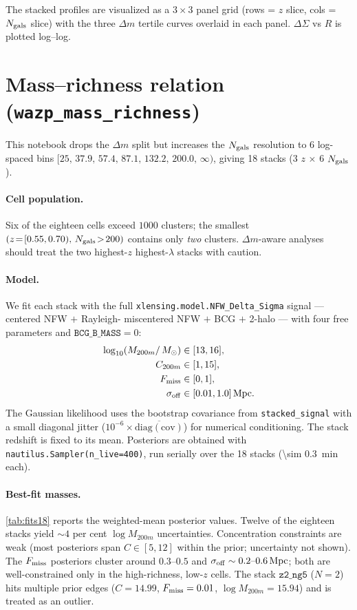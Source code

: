 \documentclass[11pt,a4paper]{article}
\newcommand{\DS}{\Delta\Sigma}
\newcommand{\dm}{\Delta m}
\newcommand{\Msun}{\,M_{\odot}}
\newcommand{\Mpc}{\,\mathrm{Mpc}}
\newcommand{\Mtwoh}{M_{200m}}
\begin{document}
The stacked profiles are visualized as a $3\times3$ panel grid (rows = $z$
slice, cols = $N_{\rm gals}$ slice) with the three $\dm$ tertile curves
overlaid in each panel. ${\DS}$ vs $R$ is plotted log--log.

\section{Mass--richness relation (\texttt{wazp\_mass\_richness})}
\label{sec:massrichness}

This notebook drops the $\dm$ split but increases the $N_{\rm gals}$
resolution to 6 log-spaced bins
$[25,\,37.9,\,57.4,\,87.1,\,132.2,\,200.0,\,\infty)$, giving 18 stacks
($3$ $z$ $\times$ $6$ $N_{\rm gals}$).

\paragraph{Cell population.} Six of the eighteen cells exceed $1000$
clusters; the smallest $(z\!=\![0.55,0.70),\,N_{\rm gals}\!>\!200)$
contains only \emph{two} clusters. ${\dm}$-aware analyses should treat the
two highest-$z$ highest-$\lambda$ stacks with caution.

\paragraph{Model.} We fit each stack with the full
\verb|xlensing.model.NFW_Delta_Sigma| signal --- centered NFW $+$ Rayleigh-
miscentered NFW $+$ BCG $+$ 2-halo --- with four free parameters and
$\texttt{BCG\_B\_MASS}=0$:
\begin{align*}
  \log_{10}(\Mtwoh / \Msun) &\in [13, 16], \\
  C_{200m} &\in [1, 15], \\
  F_{\rm miss} &\in [0, 1], \\
  \sigma_{\rm off} &\in [0.01, 1.0]\Mpc.
\end{align*}
The Gaussian likelihood uses the bootstrap covariance from
\verb|stacked_signal| with a small diagonal jitter
($10^{-6}\times\overline{\mathrm{diag(cov)}}$) for numerical conditioning.
The stack redshift is fixed to its mean. Posteriors are obtained with
\verb|nautilus.Sampler(n_live=400)|, run serially over the 18 stacks
(\SI{\sim 0.3}{\minute} each).

\paragraph{Best-fit masses.}
\autoref{tab:fits18} reports the weighted-mean posterior values. Twelve of
the eighteen stacks yield $\sim 4$ per cent $\log\Mtwoh$ uncertainties.
Concentration constraints are weak (most posteriors span $C\in[5,12]$
within the prior; uncertainty not shown). The $F_{\rm miss}$ posteriors
cluster around $0.3\text{--}0.5$ and $\sigma_{\rm off}\sim 0.2\text{--}0.6\Mpc$;
both are well-constrained only in the high-richness, low-$z$ cells. The
stack $\mathtt{z2\_ng5}$ ($N=2$) hits multiple prior edges
($C=14.99$, $F_{\rm miss}=0.01$, $\log\Mtwoh = 15.94$) and is treated as
an outlier.
\end{document}
